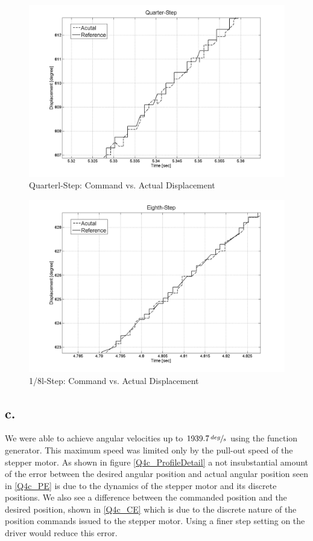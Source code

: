 \documentclass{article}
\theoremstyle{plain}
\theoremstyle{definition}
\theoremstyle{remark}
\begin{document}
\begin{figure}[b]
\includegraphics[width=1\textwidth]{Q4_quarter_step_L.png}
\caption{Quarterl-Step: Command vs. Actual Displacement} \label{tex}
\label{fig:q4_17}
\end{figure}

\begin{figure}[b]
\includegraphics[width=1\textwidth]{Q4_eighth_step_L.png}
\caption{1/8l-Step: Command vs. Actual Displacement} \label{tex}
\label{fig:q4_18}
\end{figure}
\subsection*{c.}

We were able to achieve angular velocities up to $1939.7 \, \sfrac{deg}{s}$ using the function generator.  This maximum speed was limited only by the pull-out speed of the stepper motor.  As shown in figure \ref{Q4c_ProfileDetail} a not insubstantial amount of the error between the desired angular position and actual angular position seen in \ref{Q4c_PE} is due to the dynamics of the stepper motor and its discrete positions.  We also see a difference between the commanded position and the desired position, shown in \ref{Q4c_CE} which is due to the discrete nature of the position commands issued to the stepper motor.  Using a finer step setting on the driver would reduce this error.
\end{document}
